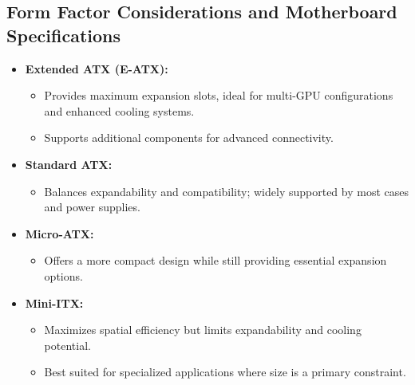 \documentclass{article}
\begin{document}
\subsection{Form Factor Considerations and Motherboard Specifications}
\begin{itemize}[itemsep=5pt]
    \item \textbf{Extended ATX (E-ATX):} 
    \begin{itemize}[label=--]
        \item Provides maximum expansion slots, ideal for multi-GPU configurations and enhanced cooling systems.
        \item Supports additional components for advanced connectivity.
    \end{itemize}
    \item \textbf{Standard ATX:}
    \begin{itemize}[label=--]
        \item Balances expandability and compatibility; widely supported by most cases and power supplies.
    \end{itemize}
    \item \textbf{Micro-ATX:}
    \begin{itemize}[label=--]
        \item Offers a more compact design while still providing essential expansion options.
    \end{itemize}
    \item \textbf{Mini-ITX:}
    \begin{itemize}[label=--]
        \item Maximizes spatial efficiency but limits expandability and cooling potential.
        \item Best suited for specialized applications where size is a primary constraint.
    \end{itemize}
\end{itemize}
\end{document}
